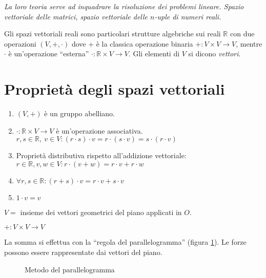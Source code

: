 \begin{center}
\indent
\textit{La loro teoria serve ad inquadrare la risoluzione dei problemi lineare. Spazio vettoriale delle matrici, spazio vettoriale delle $n$-uple di numeri reali.}
\end{center}

Gli spazi vettoriali reali sono particolari strutture algebriche sui reali $\mathbb{R}$ con due operazioni $\left( V, +, \cdot \right)$ dove + \`e la classica operazione binaria $+ : V \times V \to V$, mentre $\cdot$ \`e un'operazione ``esterna'' $\cdot : \mathbb{R} \times V \to V$. Gli elementi di $V$ si dicono \textit{vettori}.

\section{Propriet\`a degli spazi vettoriali}

\begin{enumerate}
    \item $\left ( V, + \right )$ \`e un gruppo abelliano.
    \item $ \cdot : \mathbb{R} \times V \to V $ \`e un'operazione associativa. $ r, s \in \mathbb{R}, \ v \in V : \left( r \cdot s \right ) \cdot v = r \cdot (s \cdot v) = s \cdot (r \cdot v)$
    \item Propriet\`a distributiva rispetto all'addizione vettoriale: $ r \in \mathbb{R}, v, w \in V : r \cdot (v + w) = r \cdot v + r \cdot w$
    \item $ \forall r, s \in \mathbb{R} : (r + s) \cdot v = r \cdot v + s \cdot v $
    \item $1 \cdot v = v$
\end{enumerate}

$V =$ insieme dei vettori geometrici del piano applicati in $O$.

$+ : V \times V \to V$

La somma si effettua con la ``regola del parallelogramma'' (figura \ref{fig:parallelogramma}). Le forze possono essere rappresentate dai vettori del piano.

\begin{figure}[ht]
\centering
{}
\caption{\label{fig:parallelogramma}Metodo del parallelogramma}
\end{figure}

